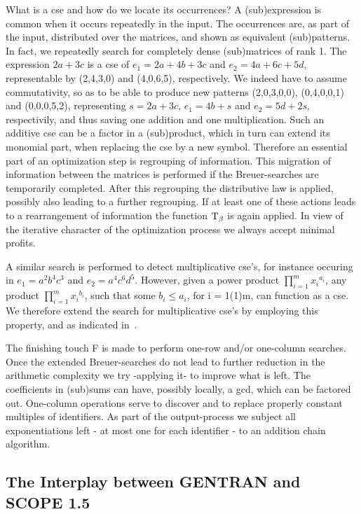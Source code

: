 What is a cse and how do we locate its occurrences?  A (sub)expression
is common when it occurs repeatedly in the input. The occurrences are,
as part of the input, distributed over the matrices, and shown as
equivalent (sub)patterns.  In fact, we repeatedly search for
completely dense (sub)matrices of rank 1.  The expression $2a + 3c$
is a cse of ${e_1}  = 2a + 4b + 3c$ and ${e_2} = 4a + 6c + 5d$, 
representable by (2,4,3,0) and (4,0,6,5), respectively.  We
indeed have to assume commutativity, so as to be able to produce new
patterns (2,0,3,0,0), (0,4,0,0,1) and (0,0,0,5,2), representing $s = 2a + 3c$,
 ${e_1} = 4b + s$ and ${e_2} = 5d + 2s$,
respectivily, and thus saving one addition and one multiplication.
Such an additive cse can be a factor in a (sub)product,
which in turn can extend its monomial part, when replacing the cse 
by a new symbol. Therefore an essential part of an
optimization step is regrouping of information. This migration of
information between the matrices is performed if the Breuer-searches
are temporarily completed.  After this regrouping the distributive law
is applied, possibly also leading to a further regrouping. If at
least one of these actions leads to a rearrangement of information the
function ${\rm T} _{\beta}$ is again applied.  In view of the
iterative character of the optimization process we always accept
minimal profits.

A similar search is performed to detect multiplicative cse's, for
instance occuring in ${e_1} = {a^2} {b^4} {c^3}$ and ${e_2} =
{a^4} {c^6} {d^5}$.  However, given a power product $\prod_{i=1}^m
{x_i}^{{a}_i}$, any product $\prod_{i=1}^m {x_i}^{{b}_i}$, such that
some ${b_i} \leq  {a_i}$, for i = 1(1)m, can function as a cse.  We
therefore extend the search for multiplicative cse's by employing this
property, and as indicated in~\cite{vanHulzen:83}.

The finishing touch F is made to perform one-row and/or
one-column searches. Once the extended Breuer-searches do not lead to
further reduction in the arithmetic complexity we try -applying it- to
improve what is left.  The coefficients in (sub)sums can have,
possibly locally, a gcd, which can be factored out.  One-column
operations serve to discover and to replace properly constant multiples of
identifiers.  As part of the output-process we subject all
exponentiations left - at most one for each identifier - to an
addition chain algorithm.  

\subsection{The Interplay between GENTRAN and SCOPE 1.5}\label{SCOPE:inter}

